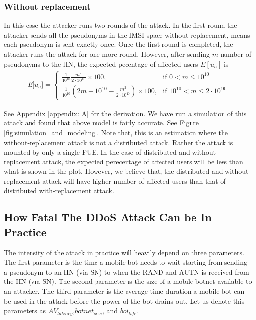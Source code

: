 \documentclass{llncs} %
\begin{document}
\subsubsection{Without replacement}
In this case the attacker runs two rounds of the attack. In the first round the attacker sends all the pseudonyms in the IMSI space without replacement, means each pseudonym is sent exactly once. Once the first round is completed, the attacker runs the attack for one more round. However, after sending $m$ number of pseudonyms to the HN, the expected pecentage of affected users $E[u_a]$ is
\begin{eqnarray}
E\big[ u_a \big] = \begin{cases} \frac{1}{10^{10}}\frac{m^2}{2\cdot 10^{10}} \times 100, & \mbox{if } 0 < m \leq 10^{10} \\ 
\frac{1}{10^{10}}(2m - 10^{10} - \frac{m^2}{2\cdot 10^{10}}) \times 100, & \mbox{if } 10^{10} < m \leq 2\cdot 10^{10} \end{cases}
\label{eqn:without_replacement}
\end{eqnarray} 

See Appendix \ref{appendix: A} for the derivation. We have run a simulation of this attack and found that above model is fairly accurate. See Figure \ref{fig:simulation_and_modeling}. Note that, this is an estimation where the without-replacement attack is not a distributed attack. Rather the attack is mounted by only a single FUE. In the case of distributed and without replacement attack, the expected perecentage of affected users will be less than what is shown in the plot. However, we believe that, the distributed and without replacement attack will have higher number of affected users than that of distributed with-replacement attack.


\subsection{How Fatal The DDoS Attack Can be In Practice} \label{sec:how_fatal_ddos}
The intensity of the attack in practice will heavily depend on three parameters. The first parameter is the time a mobile bot needs to wait starting from sending a pseudonym to an HN (via SN) to when the RAND and AUTN is received from the HN (via SN). The second parameter is the size of a mobile botnet available to an attacker. The third parameter is the average time duration a mobile bot can be used in the attack before the power of the bot drains out. Let us denote this parameters as $AV_{latency}$,$botnet_{size}$, and $bot_{life}$. 
\end{document}
